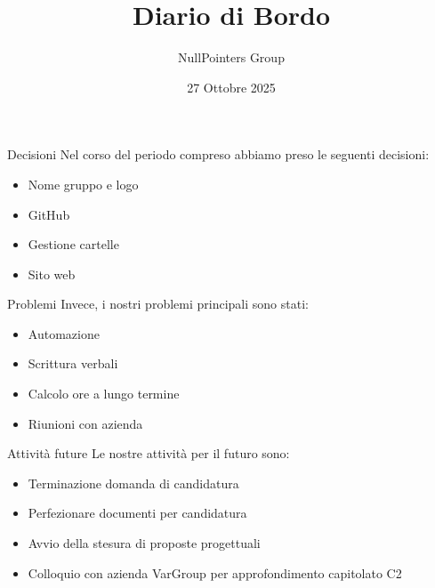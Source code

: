 \documentclass[11pt]{beamer}
\author{NullPointers Group}
\title{Diario di Bordo}
\institute{Università di Padova}
\date{27 Ottobre 2025}
\begin{document}
\begin{frame}
\titlepage
\end{frame}

\begin{frame}{Decisioni}
	Nel corso del periodo compreso abbiamo preso le seguenti decisioni:
	\begin{itemize}
		\item Nome gruppo e logo
		\item GitHub
		\item Gestione cartelle
		\item Sito web
	\end{itemize}
\end{frame}

\begin{frame}{Problemi}
	Invece, i nostri problemi principali sono stati:
	\begin{itemize}
		\item Automazione
		\item Scrittura verbali
		\item Calcolo ore a lungo termine
		\item Riunioni con azienda
	\end{itemize}
\end{frame}

\begin{frame}{Attività future}
	Le nostre attività per il futuro sono:
	\begin{itemize}
		\item Terminazione domanda di candidatura
		\item Perfezionare documenti per candidatura
		\item Avvio della stesura di proposte progettuali
		\item Colloquio con azienda VarGroup per approfondimento capitolato C2
	\end{itemize}
\end{frame}
\end{document}
